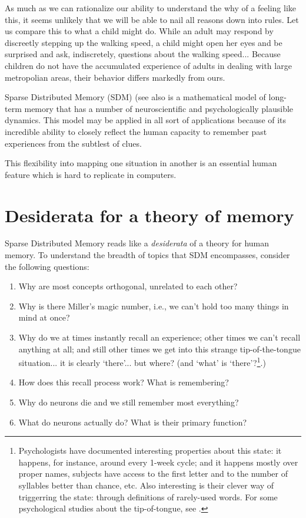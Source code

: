 As much as we can rationalize our ability to understand the why of a feeling like this, it seems unlikely that we will be able to nail all reasons down into rules.  Let us compare this to what a child might do.  While an adult may respond by discreetly stepping up the walking speed, a child might open her eyes and be surprised and ask, indiscretely, questions about the walking speed... Because children do not have the accumulated experience of adults in dealing with large metropolian areas, their behavior differs markedly from ours.

Sparse Distributed Memory (SDM) \citep{Kanerva1988} (see also \citep{kanerva_sparse_1993, denning_sparse_1989} is a mathematical model of long-term memory that has a number of neuroscientific and psychologically plausible dynamics. This model may be applied in all sort of applications because of its incredible ability to closely reflect the human capacity to remember past experiences from the subtlest of clues.

This flexibility into mapping one situation in another is an essential human feature which is hard to replicate in computers.

\section{Desiderata for a theory of memory}


Sparse Distributed Memory reads like a \emph{desiderata} of a theory for human memory.  To understand the breadth of topics that SDM encompasses, consider the following questions:
\begin{enumerate}
    \item Why are most concepts orthogonal, unrelated to each other?
    \item Why is there Miller's magic number, i.e., we can't hold too many things in mind at once?
    \item Why do we at times instantly recall an experience; other times we can't recall anything at all; and still other times we get into this strange tip-of-the-tongue situation... it is clearly `there'... but where?  (and `what' is `there'?\footnote{Psychologists have documented interesting properties about this state:  it happens, for instance, around every 1-week cycle; and it happens mostly over proper names, subjects have access to the first letter and to the number of syllables better than chance, etc. Also interesting is their clever way of triggerring the state: through definitions of rarely-used words.  For some psychological studies about the tip-of-tongue, see \citet{meyer_tip---tongue_1992, brown_review_1991, brown_tip_1966}.}.)
    \item How does this recall process work?  What is remembering?
    \item Why do neurons die and we still remember most everything?
    \item What do neurons actually do?  What is their primary function?
\end{enumerate}

